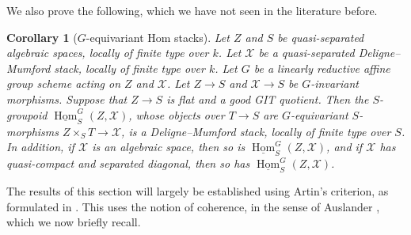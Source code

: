 \documentclass[a4paper]{amsart}
\theoremstyle{plain}
\newtheorem{corollary}[theorem]{Corollary}
\theoremstyle{definition}
\theoremstyle{remark}
\numberwithin{equation}{section}
\newcommand\cX{\mathcal{X}}
\DeclareMathOperator{\Hom}{Hom}
\begin{document}
We also prove the following, which we have not seen in the literature before.
\begin{corollary}[$G$-equivariant Hom stacks] \label{C:homG}
Let $Z$ and $S$ be quasi-separated algebraic spaces, locally of finite type over $k$. Let $\cX$ be a quasi-separated Deligne--Mumford stack, locally of finite type over $k$. 
Let $G$ be a linearly reductive affine group scheme acting on $Z$ and $\cX$.
Let $Z \to S$ and $\cX \to S$ be
$G$-invariant morphisms.  Suppose that $Z \to S$ is flat and a good GIT quotient.  Then the $S$-groupoid
$\underline{\Hom}_S^{G}(Z, \cX)$, whose objects over $T \to S$ are $G$-equivariant $S$-morphisms $Z \times_S T \to \cX$, 
is a Deligne--Mumford stack, locally of finite type over $S$. In addition, if $\cX$ is an algebraic space, then so is $\underline{\Hom}_S^{G}(Z, \cX)$, and
if $\cX$ has quasi-compact and separated diagonal, then so has $\underline{\Hom}_S^{G}(Z, \cX)$.
\end{corollary}
The results of this section will largely be established using Artin's criterion, as formulated in \cite[Thm.~A]{hallj_openness_coh}. This uses the notion of coherence, in the sense of Auslander \cite{auslander}, which we now briefly recall.
\end{document}
